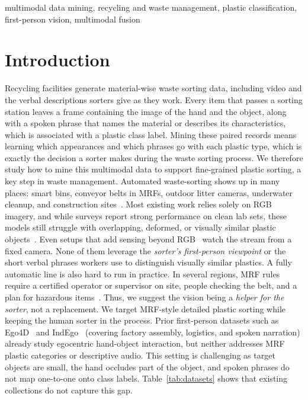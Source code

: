 \documentclass[conference]{IEEEtran}
\begin{document}
\begin{IEEEkeywords}
multimodal data mining, recycling and waste management, plastic classification, first-person vision, multimodal fusion
\end{IEEEkeywords}

\section{Introduction}
Recycling facilities generate material-wise waste sorting data, including video and the verbal descriptions sorters give as they work. Every item that passes a sorting station leaves a frame containing the image of the hand and the object, along with a spoken phrase that names the material or describes its characteristics, which is associated with a plastic class label. Mining these paired records means learning which appearances and which phrases go with each plastic type, which is exactly the decision a sorter makes during the waste sorting process. We therefore study how to mine this multimodal data to support fine-grained plastic sorting, a key step in waste management.
Automated waste-sorting shows up in many places: smart bins, conveyor belts in MRFs, outdoor litter cameras, underwater cleanup, and construction sites~\cite{gundupalli2017sorting,tamin2026review}.
Most existing work relies solely on RGB imagery, and while surveys report strong performance on clean lab sets, these models still struggle with overlapping, deformed, or visually similar plastic objects~\cite{thung2016trashnet,bashkirova2022zerowaste,yudin2024warp}.
Even setups that add sensing beyond RGB~\cite{friedrich2022sensor,luo2024mdcf} watch the stream from a fixed camera. None of them leverage the \emph{sorter's first-person viewpoint} or the short verbal phrases workers use to distinguish visually similar plastics.
A fully automatic line is also hard to run in practice. In several regions, MRF rules require a certified operator or supervisor on site, people checking the belt, and a plan for hazardous items~\cite{arkansas2024mrflicense,connecticut2024recycling,uk2022mrf,hse2024wasteprocessing}.
Thus, we suggest the vision being a \emph{helper for the sorter}, not a replacement.
We target MRF-style detailed plastic sorting while keeping the human sorter in the process.
Prior first-person datasets such as Ego4D~\cite{grauman2022ego4d} and IndEgo~\cite{chavan2025indego} (covering factory assembly, logistics, and spoken narration) already study egocentric hand-object interaction, but neither addresses MRF plastic categories or descriptive audio.
This setting is challenging as target objects are small, the hand occludes part of the object, and spoken phrases do not map one-to-one onto class labels. Table~\ref{tab:datasets} shows that existing collections do not capture this gap.
\end{document}
